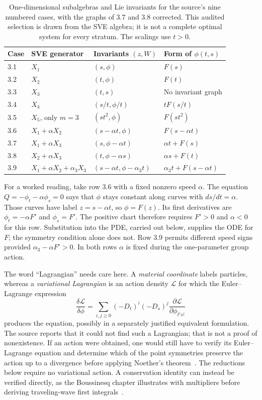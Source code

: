 \begin{table}[htbp]
\centering\small
\begin{tabularx}{\linewidth}{@{}p{.85cm}p{3.3cm}p{3.0cm}X@{}}
\toprule
Case & SVE generator & Invariants $(z,W)$ & Form of $\phi(t,s)$\\
\midrule
3.1 & $X_1$ & $(s,\phi)$ & $F(s)$\\
3.2 & $X_2$ & $(t,\phi)$ & $F(t)$\\
3.3 & $X_3$ & $(t,s)$ & No invariant graph\\
3.4 & $X_4$ & $(s/t,\phi/t)$ & $tF(s/t)$\\
3.5 & $X_5$, only $m=3$ & $(st^2,\phi)$ & $F(st^2)$\\
3.6 & $X_1+\alpha X_2$ & $(s-\alpha t,\phi)$ & $F(s-\alpha t)$\\
3.7 & $X_1+\alpha X_3$ & $(s,\phi-\alpha t)$ & $\alpha t+F(s)$\\
3.8 & $X_2+\alpha X_3$ & $(t,\phi-\alpha s)$ & $\alpha s+F(t)$\\
3.9 & $X_1+\alpha X_2+\alpha_3X_3$ & $(s-\alpha t,\phi-\alpha_3t)$ & $\alpha_3t+F(s-\alpha t)$\\
\bottomrule
\end{tabularx}
\caption{One-dimensional subalgebras and Lie invariants for the source's
nine numbered cases, with the graphs of 3.7 and 3.8 corrected.
This audited selection is drawn from the SVE algebra; it is not a complete
optimal system for every stratum. The scalings use $t>0$.}
\label{tab:sve-repro-invariants}
\end{table}

For a worked reading, take row 3.6 with a fixed nonzero speed $\alpha$.
The equation $Q=-\phi_t-\alpha\phi_s=0$ says that $\phi$ stays
constant along curves with $ds/dt=\alpha$. Those curves have label
$z=s-\alpha t$, so $\phi=F(z)$. Its first derivatives are
$\phi_t=-\alpha F'$ and $\phi_s=F'$. The positive chart therefore
requires $F'>0$ and $\alpha<0$ for this row. Substitution into the PDE,
carried out below, supplies the ODE for $F$; the symmetry condition alone
does not. Row 3.9 permits different speed signs provided
$\alpha_3-\alpha F'>0$. In both rows $\alpha$ is fixed during the
one-parameter group action.

The word ``Lagrangian'' needs care here. A \emph{material coordinate}
labels particles, whereas a \emph{variational Lagrangian} is an action
density $\mathcal L$ for which the Euler--Lagrange expression
\[
 \frac{\delta\mathcal L}{\delta\phi}
 =\sum_{i,j\geq0}(-D_t)^i(-D_s)^j
       \frac{\partial\mathcal L}{\partial\phi_{t^is^j}}
\]
produces the equation, possibly in a separately justified equivalent
formulation. The source reports that it could not find such a
Lagrangian; that is not a proof of nonexistence. If an action were
obtained, one would still have to verify its Euler--Lagrange equation
and determine which of the point symmetries preserve the action up to a
divergence before applying Noether's theorem~\cite{noether}.
The reductions below require no variational action. A conservation
identity can instead be verified directly, as the Boussinesq chapter
illustrates with multipliers before deriving traveling-wave first
integrals~\cite[Sec.~4, pp.~166--169]{bruzon-gandarias-2021}.

